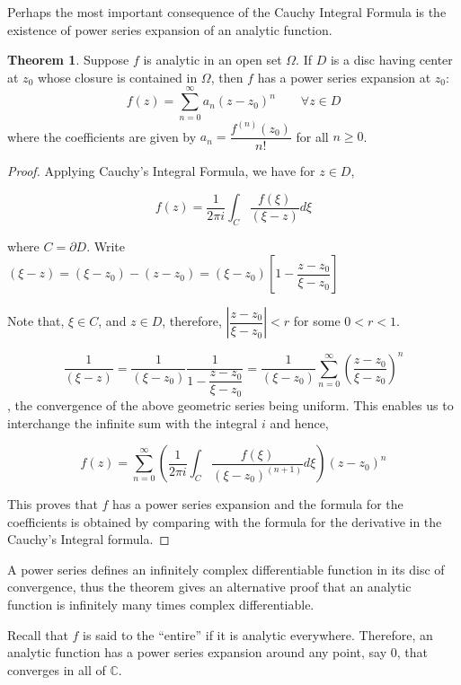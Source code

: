 \documentclass[12pt]{article}
\newcommand{\C}{\mathbb{C}}
\theoremstyle{definition}
\newtheorem{thm}{Theorem}
\newenvironment{theorem}{
\begin{tcolorbox}[colback=green!5!white,colframe=green!75!black, parbox = false]\begin{thm} }{\end{thm}\end{tcolorbox} }
\newenvironment{note}{
\begin{tcolorbox}[colback=blue!5!white,colframe=blue!75!black,title=Note, parbox = false] }{\end{tcolorbox} }
\begin{document}
Perhaps the most important consequence of the Cauchy Integral Formula is the existence of power series expansion of an analytic function.

\begin{theorem}
    Suppose $f$ is analytic in an open set $\Omega$. If $D$ is a disc having center at $z_0$ whose closure is contained in $\Omega$, then $f$ has a power series expansion at $z_0$:
    $$f(z) = \sum_{n= 0}^{\infty} a_n (z - z_0)^n \qquad \forall z \in D$$
    where the coefficients are given by $a_n = \dfrac{f^{(n)}(z_0)}{n!}$ for all $n \geq 0$.
\end{theorem}

\begin{proof}
    Applying Cauchy's Integral Formula, we have for $z \in D$,

    $$f(z) = \dfrac{1}{2\pi i} \int_{C} \dfrac{f(\xi)}{(\xi - z)} d\xi$$

    where $C = \partial D$. Write $(\xi - z) = (\xi - z_0) - (z - z_0) = (\xi - z_0) \left[ 1 - \dfrac{z - z_0}{\xi - z_0} \right]$

    Note that, $\xi \in C$, and $z \in D$, therefore, $\left\vert \dfrac{z - z_0}{\xi - z_0} \right\vert < r$ for some $0 < r < 1$.

    $$\dfrac{1}{(\xi - z)} = \dfrac{1}{(\xi - z_0)} \dfrac{1}{1 - \dfrac{z - z_0}{\xi - z_0}} = \dfrac{1}{(\xi - z_0)} \sum_{n = 0}^{\infty} \left( \dfrac{z - z_0}{\xi - z_0} \right)^n$$, the convergence of the above geometric series being uniform. This enables us to interchange the infinite sum with the integral $i$ and hence,

    $$f(z) = \sum_{n = 0}^{\infty} \left( \dfrac{1}{2\pi i} \int_{C} \dfrac{f(\xi)}{(\xi - z_0)^{(n+1)}}d\xi \right) (z - z_0)^{n}$$

    This proves that $f$ has a power series expansion and the formula for the coefficients is obtained by comparing with the formula for the derivative in the Cauchy's Integral formula.
\end{proof}

\begin{note}
    A power series defines an infinitely complex differentiable function in its disc of convergence, thus the theorem gives an alternative proof that an analytic function is infinitely many times complex differentiable.

    Recall that $f$ is said to the ``entire'' if it is analytic everywhere. Therefore, an analytic function has a power series expansion around any point, say $0$, that converges in all of $\C$.
\end{note}
\end{document}
